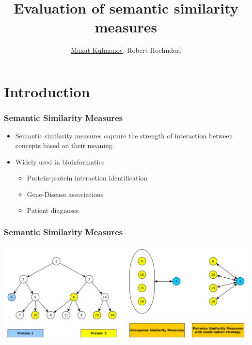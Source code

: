 \documentclass{beamer}
\title[Similarity Measures]{Evaluation of semantic similarity measures} %
\author{\underline{Maxat Kulmanov}, Robert Hoehndorf} %
\institute[] %
{
King Abdullah University of Science and Technology, Saudi Arabia \\
Computational Bioscience Research Center \\
Bio-Ontologies Research Group%
\medskip
}
\date{} %
\begin{document}
\begin{frame}
\titlepage %
\end{frame}


\section{Introduction} %


\begin{frame}
\frametitle{Semantic Similarity Measures}
\begin{itemize}
\item Semantic similarity measures capture the strength of interaction between concepts based on their meaning.
\item Widely used in bioinformatics
\begin{itemize}
\item Protein-protein interaction identification
\item Gene-Disease associations
\item Patient diagnoses 
\end{itemize}
\end{itemize}
\end{frame}


\begin{frame}
\frametitle{Semantic Similarity Measures}
\includegraphics[width=1.0\linewidth]{figures/annots.pdf}
\end{frame}
\end{document}
